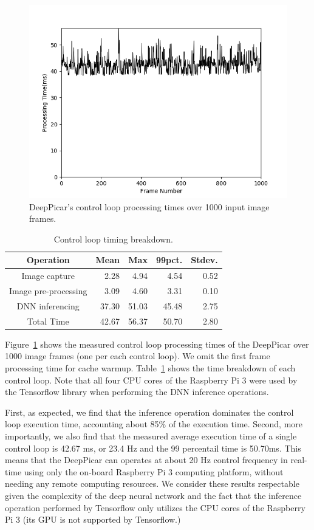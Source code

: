 
\begin{figure}[t]
  \centering
  \includegraphics[width=.5\textwidth]{Total_Processing_Time}
  \caption{DeepPicar's control loop processing times over 1000 input image frames.}
  \label{fig:control-loop-timing}
\end{figure}

\begin{table}[t]
  \centering
  \begin{tabular} {| c | r | r | r | r |}
    \hline
    \textbf{Operation} & \textbf{Mean} & \textbf{Max} &   \textbf{99pct.} & \textbf{Stdev.} \\ \hline
    Image capture        & 2.28  &  4.94 &  4.54  & 0.52 \\ \hline
    Image pre-processing & 3.09  &  4.60 &  3.31  & 0.10 \\ \hline
    DNN inferencing      & 37.30 & 51.03 & 45.48  & 2.75 \\ \hline
    Total Time           & 42.67 & 56.37 & 50.70  & 2.80 \\ \hline
  \end{tabular}
  \caption{Control loop timing breakdown.}
  \label{tbl:control-loop-breakdown}
\end{table}

Figure~\ref{fig:control-loop-timing} shows the measured control loop 
processing times of the DeepPicar over 1000 image frames (one per each
control loop). We omit the first frame processing time for cache
warmup. Table~\ref{tbl:control-loop-breakdown} shows the time
breakdown of each control loop. Note that all four CPU cores of the
Raspberry Pi 3 were used by the Tensorflow library when performing the
DNN inference operations.

First, as expected, we find that the inference operation
dominates the control loop execution time, accounting about 85\% of
the execution time.
Second, more importantly, we also find that the measured average
execution time of a single control loop is 42.67 ms, or 23.4 Hz and
the 99 percentail time is 50.70ms.
This means that the DeepPicar can operates
at about 20 Hz control frequency in real-time using only the on-board
Raspberry Pi 3 computing platform, without needing any remote computing
resources. We consider these results respectable given the complexity
of the deep neural network  and the fact that the inference operation
performed by Tensorflow only utilizes the CPU cores of the
Raspberry Pi 3 (its GPU is not supported by Tensorflow.)

